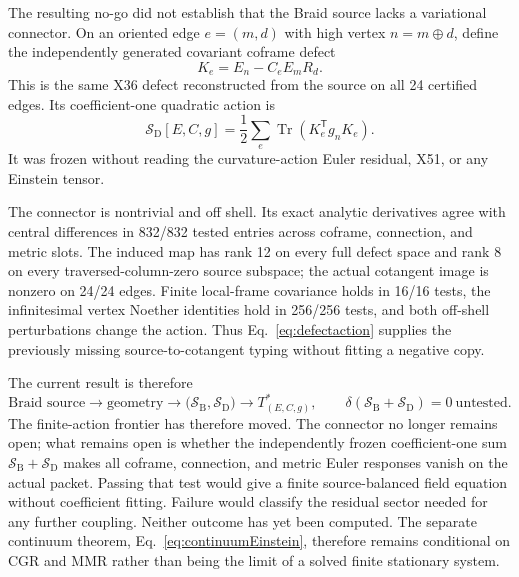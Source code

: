 \documentclass[11pt]{article}
\theoremstyle{definition}
\theoremstyle{remark}
\newcommand{\Tr}{\operatorname{Tr}}
\begin{document}
The resulting no-go did not establish that the Braid source lacks a variational connector. On an oriented edge $e=(m,d)$ with high vertex $n=m\oplus d$, define the independently generated covariant coframe defect
\begin{equation}\label{eq:defectconnector}
 K_e=E_n-C_eE_mR_d.
\end{equation}
This is the same X36 defect reconstructed from the source on all 24 certified edges. Its coefficient-one quadratic action is
\begin{equation}\label{eq:defectaction}
 \mathcal S_{\mathrm D}[E,C,g]
 =\frac12\sum_e\Tr\!\left(K_e^{\mathsf T}g_nK_e\right).
\end{equation}
It was frozen without reading the curvature-action Euler residual, X51, or any Einstein tensor.

The connector is nontrivial and off shell. Its exact analytic derivatives agree with central differences in 832/832 tested entries across coframe, connection, and metric slots. The induced map has rank 12 on every full defect space and rank 8 on every traversed-column-zero source subspace; the actual cotangent image is nonzero on 24/24 edges. Finite local-frame covariance holds in 16/16 tests, the infinitesimal vertex Noether identities hold in 256/256 tests, and both off-shell perturbations change the action. Thus Eq.~\eqref{eq:defectaction} supplies the previously missing source-to-cotangent typing without fitting a negative copy.

The current result is therefore
\begin{equation}\label{eq:frontier}
 \boxed{
 \text{Braid source}\to\text{geometry}
 \to\bigl(\mathcal S_{\mathrm B},\mathcal S_{\mathrm D}\bigr)
 \to T^*_{(E,C,g)},
 \qquad
 \delta\!\left(\mathcal S_{\mathrm B}+\mathcal S_{\mathrm D}\right)=0
 \ \text{untested}.}
\end{equation}
The finite-action frontier has therefore moved. The connector no longer remains open; what remains open is whether the independently frozen coefficient-one sum $\mathcal S_{\mathrm B}+\mathcal S_{\mathrm D}$ makes all coframe, connection, and metric Euler responses vanish on the actual packet. Passing that test would give a finite source-balanced field equation without coefficient fitting. Failure would classify the residual sector needed for any further coupling. Neither outcome has yet been computed. The separate continuum theorem, Eq.~\eqref{eq:continuumEinstein}, therefore remains conditional on CGR and MMR rather than being the limit of a solved finite stationary system.
\end{document}
